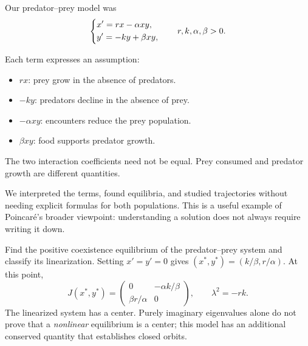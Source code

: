 \documentclass[11pt,letterpaper]{article}
\begin{document}
Our predator--prey model was
\[
\begin{dcases}
x'=rx-\alpha xy,\\
y'=-ky+\beta xy,
\end{dcases}
\qquad r,k,\alpha,\beta>0.
\]

Each term expresses an assumption:
\begin{itemize}
    \item $rx$: prey grow in the absence of predators.
    \item $-ky$: predators decline in the absence of prey.
    \item $-\alpha xy$: encounters reduce the prey population.
    \item $\beta xy$: food supports predator growth.
\end{itemize}

The two interaction coefficients need not be equal.
Prey consumed and predator growth are different
quantities.

We interpreted the terms, found equilibria, and
studied trajectories without needing explicit
formulas for both populations. This is a useful
example of Poincar\'e's broader viewpoint:
understanding a solution does not always require
writing it down.

\begin{example}{
Find the positive coexistence equilibrium of the
predator--prey system and classify its linearization.
}
Setting $x'=y'=0$ gives
$(x^*,y^*)=(k/\beta,r/\alpha)$. At this point,
\[
J(x^*,y^*)=
\begin{pmatrix}
0&-\alpha k/\beta\\
\beta r/\alpha&0
\end{pmatrix},
\qquad \lambda^2=-rk.
\]
The linearized system has a center. Purely imaginary
eigenvalues alone do not prove that a \emph{nonlinear}
equilibrium is a center; this model has an additional
conserved quantity that establishes closed orbits.
\end{example}
\end{document}
